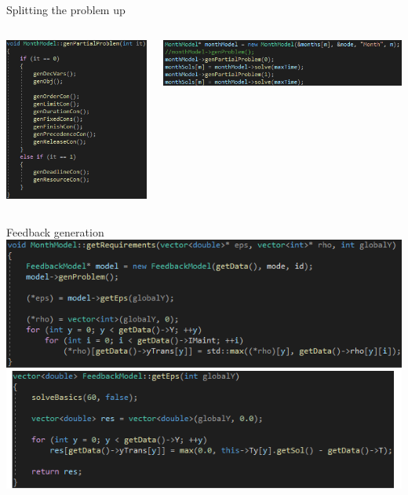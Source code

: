 \documentclass{beamer}
\begin{document}
\begin{frame}{Splitting the problem up}
\begin{columns}
\begin{column}{0.33\textwidth}
\includegraphics[width=\textwidth]{split1}
\end{column}
\begin{column}{0.66\textwidth}
\includegraphics[width=\textwidth]{split2}
\end{column}
\end{columns}
\end{frame}

\begin{frame}{Feedback generation}
\includegraphics[width=\textwidth]{feedback}
\end{frame}
\end{document}
